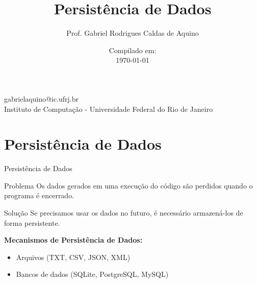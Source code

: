 
\title{Persistência de Dados}

\author{Prof. Gabriel Rodrigues Caldas de Aquino}

\institute
{
    gabrielaquino@ic.ufrj.br\\

    Instituto de Computação -
    Universidade Federal do Rio de Janeiro %
}
\date{Compilado em: \\ \today} %


\section{Persistência de Dados}

\begin{frame}
    \titlepage
\end{frame}



\begin{frame}{Persistência de Dados}
    \begin{block}{Problema}
        Os dados gerados em uma execução do código são perdidos quando o programa é encerrado.
    \end{block}

    \begin{block}{Solução}
        Se precisamos usar os dados no futuro, é necessário armazená-los de forma persistente.
    \end{block}

    \vspace{0.5cm}

    \textbf{Mecanismos de Persistência de Dados:}
    \begin{itemize}
        \item Arquivos (TXT, CSV, JSON, XML)
        \item Bancos de dados (SQLite, PostgreSQL, MySQL)
    \end{itemize}
\end{frame}

